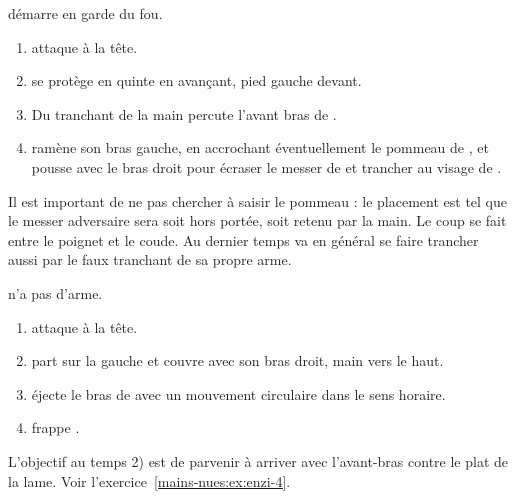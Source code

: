 \begin{technique}

\D démarre en garde du fou.

\begin{enumerate}
	\item \A attaque à la tête.
	\item \D se protège en quinte en avançant, pied gauche devant.
	\item Du tranchant de la main \D percute l'avant bras de \A.
	\item \D ramène son bras gauche, en accrochant éventuellement le pommeau de \A, et pousse avec le bras droit pour écraser le messer de \A et trancher au visage de \A.
\end{enumerate}

Il est important de ne pas chercher à saisir le pommeau : le placement est tel que le messer adversaire sera soit hors portée, soit retenu par la main.
Le coup se fait entre le poignet et le coude.
Au dernier temps \A va en général se faire trancher aussi par le faux tranchant de sa propre arme.

\end{technique}


\begin{technique}

\D n'a pas d'arme.

\begin{enumerate}
	\item \A attaque à la tête.
	\item \D part sur la gauche et couvre avec son bras droit, main vers le haut.
	\item \D éjecte le bras de \A avec un mouvement circulaire dans le sens horaire.
	\item \D frappe \A.
\end{enumerate}

L'objectif au temps 2) est de parvenir à arriver avec l'avant-bras contre le plat de la lame.
Voir l'exercice~\ref{mains-nues:ex:enzi-4}.

\end{technique}


